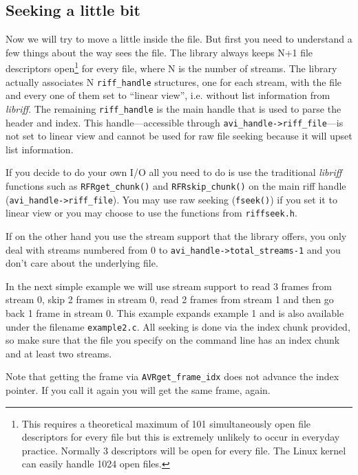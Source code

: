 \documentclass[12pt, a4paper]{article}
\begin{document}
\subsection{Seeking a little bit}
Now we will try to move a little inside the file. But first you need to understand a 
few things about the way \libavi{} sees the file. The library always keeps N+1
file descriptors open\footnote{This
requires a theoretical maximum of 101 simultaneously open file descriptors for 
every \AVI{} file but this is extremely unlikely to occur in everyday practice.
Normally 3 descriptors will be open for every file. The Linux kernel can easily 
handle 1024 open files.}
for every \AVI{} file, where N is the number of streams.
The library actually associates N \verb+riff_handle+ structures, one for each stream,
with the file and every one of them set to ``linear view'', i.e. without list 
information from \emph{libriff}.
The remaining \verb+riff_handle+ is the main handle that is used to parse the header and
index. This handle---accessible through \verb+avi_handle->riff_file+---is not set
to linear view and cannot be used for raw file seeking because it will upset list information.

If you decide to do your own I/O all you need to do is use the traditional \emph{libriff}
functions such as \verb+RFRget_chunk()+ and \verb+RFRskip_chunk()+ on the main
riff handle (\verb+avi_handle->riff_file+). You may use raw seeking (\verb+fseek()+)
if you set it to linear view or you may choose to use the functions from 
\verb+riffseek.h+.

If on the other hand you use the stream support that the library offers, you only deal
with streams numbered from 0 to \verb+avi_handle->total_streams-1+ and
you don't care about the underlying file.

In the next simple example we will use stream support to read 3 frames from stream 0, 
skip 2 frames in stream 0, read 2 frames from stream 1 and then go back 1 frame in stream 0.
This example expands example 1 and is also available under the filename
\verb+example2.c+. All seeking is done via the index chunk provided, so make
sure that the \AVI{} file you specify on the command line has an index chunk
and at least two streams.



Note that getting
the frame via \verb+AVRget_frame_idx+ does not advance the index pointer.
If you call it again you will get the same frame, again.
\end{document}
